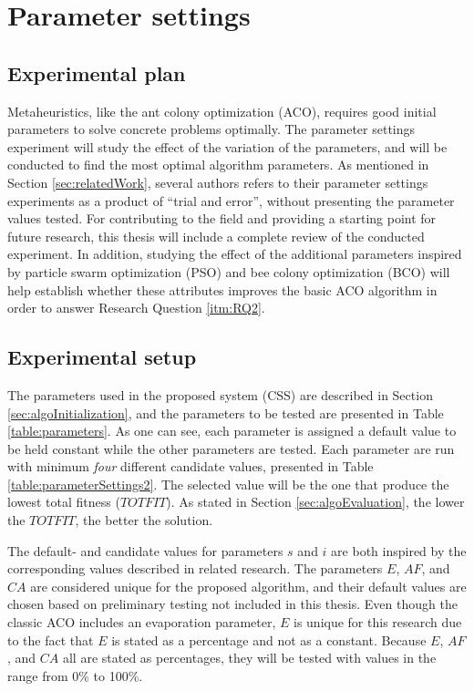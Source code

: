 \section{Parameter settings}
\label{sec:parametersettings}

\subsection{Experimental plan}
Metaheuristics, like the ant colony optimization (ACO), requires good initial parameters to solve concrete problems optimally. The parameter settings experiment will study the effect of the variation of the parameters, and will be conducted to find the most optimal algorithm parameters. As mentioned in Section \vref{sec:relatedWork}, several authors refers to their parameter settings experiments as a product of ``trial and error'', without presenting the parameter values tested. For contributing to the field and providing a starting point for future research, this thesis will include a complete review of the conducted experiment. %
In addition, studying the effect of the additional parameters inspired by particle swarm optimization (PSO) and bee colony optimization (BCO) will help establish whether these attributes improves the basic ACO algorithm in order to answer Research Question \vref{itm:RQ2}.

\subsection{Experimental setup}
\label{subsec:parameterSettings_setup}
The parameters used in the proposed system (CSS) are described in Section \vref{sec:algoInitialization}, and the parameters to be tested are presented in Table \ref{table:parameters}. As one can see, each parameter is assigned a default value to be held constant while the other parameters are tested. Each parameter are run with minimum \textit{four} different candidate values, presented in Table \vref{table:parameterSettings2}. The selected value will be the one that produce the lowest total fitness ($TOTFIT$). As stated in Section \vref{sec:algoEvaluation}, the lower the $TOTFIT$, the better the solution. 

The default- and candidate values for parameters $s$ and $i$ are both inspired by the corresponding values described in related research\citep{salehi-nezhad07, poorzahedy11, sedighpour14, kechagiopoulos14}. The parameters $E$, $AF$, and $CA$ are considered unique for the proposed algorithm, and their default values are chosen based on preliminary testing not included in this thesis. Even though the classic ACO includes an evaporation parameter, $E$ is unique for this research due to the fact that $E$ is stated as a percentage and not as a constant. Because $E$, $AF$, and $CA$ all are stated as percentages, they will be tested with values in the range from 0\% to 100\%. %

